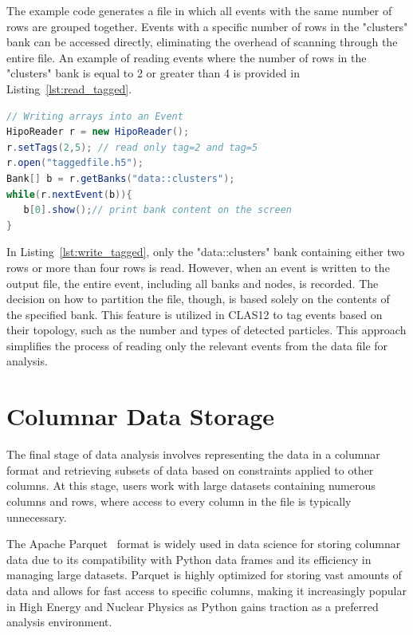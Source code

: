\documentclass[preprint,12pt]{elsarticle}
\begin{document}
The example code generates a file in which all events with the same number of rows are grouped together. Events with a specific number of rows in the "clusters" bank can be accessed directly, eliminating the overhead of scanning through the entire file. An example of reading events where the number of rows in the "clusters" bank is equal to 2 or greater than 4 is provided in Listing~\ref{lst:read_tagged}.

\begin{lstlisting}[language=java, caption=Java example to sort events in the output file depending on number of rows in the table, label=lst:read_tagged]
// Writing arrays into an Event
HipoReader r = new HipoReader();
r.setTags(2,5); // read only tag=2 and tag=5
r.open("taggedfile.h5");
Bank[] b = r.getBanks("data::clusters");
while(r.nextEvent(b)){
   b[0].show();// print bank content on the screen
}
\end{lstlisting}

In Listing~\ref{lst:write_tagged}, only the "data::clusters" bank containing either two rows or more than four rows is read. However, when an event is written to the output file, the entire event, including all banks and nodes, is recorded. The decision on how to partition the file, though, is based solely on the contents of the specified bank. This feature is utilized in CLAS12 to tag events based on their topology, such as the number and types of detected particles. This approach simplifies the process of reading only the relevant events from the data file for analysis.

\section{Columnar Data Storage}

The final stage of data analysis involves representing the data in a columnar format and retrieving subsets of data based on constraints applied to other columns. At this stage, users work with large datasets containing numerous columns and rows, where access to every column in the file is typically unnecessary. 

The Apache Parquet~\cite{PARKQUET:2020jk} format is widely used in data science for storing columnar data due to its compatibility with Python data frames and its efficiency in managing large datasets. Parquet is highly optimized for storing vast amounts of data and allows for fast access to specific columns, making it increasingly popular in High Energy and Nuclear Physics as Python gains traction as a preferred analysis environment. 
\end{document}
